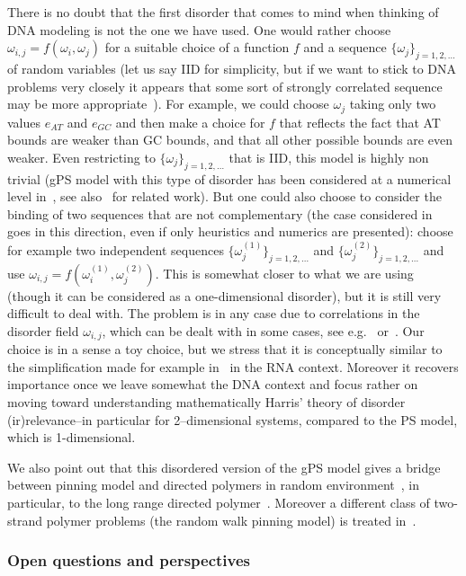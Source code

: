 \documentclass[10pt]{amsart}
\theoremstyle{definition}\newtheorem{defi}[theo]{Definition}\newtheorem{rema}[theo]{Remark}\newtheorem{exam}[theo]{Example}\newtheorem{exem}[theo]{Example}\newtheorem{nota}[theo]{Notation}
\newcommand{\go}{\omega}
\begin{document}
There is no doubt that the first disorder that comes to mind when thinking of DNA modeling is not the one we have used. One would rather choose $\go_{i,j}=f(\go_i, \go_j)$ for a suitable choice of a function $f$ and a sequence $\{\go_j\}_{j=1,2, \ldots}$ of random variables (let us say IID for simplicity, but if we want to stick to DNA problems very closely it appears that some sort of strongly correlated sequence may be more appropriate~\cite{cf:Peng}). For example, we could choose $\go_j$ taking only two values $e_{AT}$ and $e_{GC}$ and then make a choice for $f$ that reflects the fact that AT bounds are weaker than GC bounds, and that all other possible bounds are even weaker. Even restricting to $\{\go_j\}_{j=1,2, \ldots}$ that is IID, this model is highly non trivial (gPS model with this type of disorder has been considered at a numerical level in~\cite{cf:GOO,cf:GO04}, see also~\cite{cf:EON11,cf:TN08} for related work). But one could also choose to consider the binding of two sequences that are not complementary (the case considered in~\cite{cf:NG06} goes in this direction, even if only heuristics and numerics are presented): choose for example two independent sequences $\{\go^{(1)}_j\}_{j=1,2, \ldots}$ and $\{\go^{(2)}_j\}_{j=1,2, \ldots}$ and use $\go_{i,j}=f(\go^{(1)}_i, \go^{(2)}_j)$. This is somewhat closer to what we are using (though it can be considered as a one-dimensional disorder), but it is still very difficult to deal with. The problem is in any case due to correlations in the disorder field $\go_{i,j}$, which can be dealt with in some cases, see e.g.~\cite{cf:BL12,cf:BP15} or~\cite{cf:AB18, cf:CCP17}. Our choice is in a sense a toy choice, but we stress that it is conceptually similar to the simplification made for example in~\cite{cf:BundHwa} in the RNA context. Moreover it recovers importance once we leave somewhat the DNA context and focus rather on moving toward understanding mathematically Harris' theory of disorder (ir)relevance--in particular for 2--dimensional systems, compared to the PS model, which is 1-dimensional.

We also point out that this disordered version of the gPS model gives a bridge between pinning model and directed polymers in random environment~\cite{cf:Co07,cf:La10}, in particular, to the long range directed polymer~\cite{cf:Co07,cf:We15}. Moreover a different class of two-strand polymer problems (the random walk pinning model) is treated in~\cite{cf:BS1,cf:BS2,cf:BT10}.

\subsubsection{Open questions and perspectives}
\end{document}

